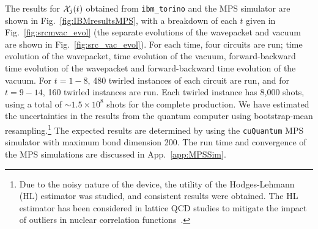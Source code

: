 \documentclass[aps, prc, tightenlines,superscriptaddress, letterpaper, amsmath, amssymb, preprintnumbers, floatfix, longbibliography, nofootinbib]{revtex4-2}
\begin{document}
%
The results for ${\cal X}_j(t)$ obtained from {\tt ibm\_torino} and the MPS simulator are shown in Fig.~\ref{fig:IBMresultsMPS}, with a breakdown of each $t$ given in Fig.~\ref{fig:srcmvac_evol} (the separate evolutions of the wavepacket and vacuum are shown in Fig.~\ref{fig:src_vac_evol}).
For each time, four circuits are run; time evolution of the wavepacket, time evolution of the vacuum, forward-backward time evolution of the wavepacket and forward-backward time evolution of the vacuum.
For $t=1-8$, 480 twirled instances of each circuit are run, and for $t=9-14$, 160 twirled instances are run. 
Each twirled instance has 8,000 shots, using a total of $\sim 1.5 \times 10^8$ shots for the complete production.
We have estimated the uncertainties in the results from the quantum computer using bootstrap-mean resampling.\footnote{Due to the noisy nature of the device, the utility of the Hodges-Lehmann (HL) estimator was studied, and consistent results were obtained.
The HL estimator has been considered in lattice QCD studies to mitigate the impact of outliers in nuclear correlation functions~\cite{Beane:2014oea,Orginos:2015aya,NPLQCD:2020lxg}.}
The expected results are determined by using the {\tt cuQuantum} MPS simulator with maximum bond dimension 200.
The run time and convergence of the MPS simulations are discussed in App.~\ref{app:MPSSim}.
\end{document}
